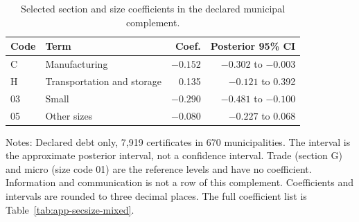 \begin{table}[H]
\centering
\caption{Selected section and size coefficients in the declared municipal complement.}\label{tab:secsize-mixed}
\footnotesize
\begin{tabular}{@{}lp{3.8cm}rr@{}}
\toprule
Code & Term & Coef. & Posterior 95\% CI \\
\midrule
C & Manufacturing & $-0.152$ & $-0.302$ to $-0.003$ \\
H & Transportation and storage & 0.135 & $-0.121$ to 0.392 \\
03 & Small & $-0.290$ & $-0.481$ to $-0.100$ \\
05 & Other sizes & $-0.080$ & $-0.227$ to 0.068 \\
\bottomrule
\end{tabular}

\vspace{0.4em}
\begin{minipage}{0.95\textwidth}
\footnotesize
Notes: Declared debt only, 7,919 certificates in 670 municipalities. The interval is the approximate posterior interval, not a confidence interval. Trade (section G) and micro (size code 01) are the reference levels and have no coefficient. Information and communication is not a row of this complement. Coefficients and intervals are rounded to three decimal places. The full coefficient list is Table~\ref{tab:app-secsize-mixed}.
\end{minipage}
\end{table}
